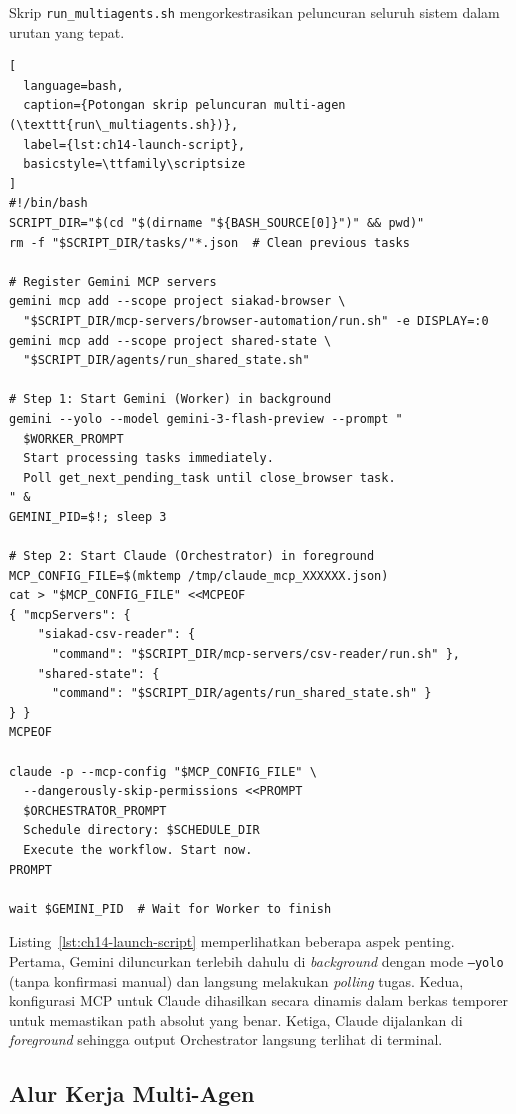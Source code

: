 Skrip \texttt{run\_multiagents.sh} mengorkestrasikan peluncuran seluruh sistem dalam urutan yang tepat.

\begin{lstlisting}[
  language=bash,
  caption={Potongan skrip peluncuran multi-agen (\texttt{run\_multiagents.sh})},
  label={lst:ch14-launch-script},
  basicstyle=\ttfamily\scriptsize
]
#!/bin/bash
SCRIPT_DIR="$(cd "$(dirname "${BASH_SOURCE[0]}")" && pwd)"
rm -f "$SCRIPT_DIR/tasks/"*.json  # Clean previous tasks

# Register Gemini MCP servers
gemini mcp add --scope project siakad-browser \
  "$SCRIPT_DIR/mcp-servers/browser-automation/run.sh" -e DISPLAY=:0
gemini mcp add --scope project shared-state \
  "$SCRIPT_DIR/agents/run_shared_state.sh"

# Step 1: Start Gemini (Worker) in background
gemini --yolo --model gemini-3-flash-preview --prompt "
  $WORKER_PROMPT
  Start processing tasks immediately.
  Poll get_next_pending_task until close_browser task.
" &
GEMINI_PID=$!; sleep 3

# Step 2: Start Claude (Orchestrator) in foreground
MCP_CONFIG_FILE=$(mktemp /tmp/claude_mcp_XXXXXX.json)
cat > "$MCP_CONFIG_FILE" <<MCPEOF
{ "mcpServers": {
    "siakad-csv-reader": {
      "command": "$SCRIPT_DIR/mcp-servers/csv-reader/run.sh" },
    "shared-state": {
      "command": "$SCRIPT_DIR/agents/run_shared_state.sh" }
} }
MCPEOF

claude -p --mcp-config "$MCP_CONFIG_FILE" \
  --dangerously-skip-permissions <<PROMPT
  $ORCHESTRATOR_PROMPT
  Schedule directory: $SCHEDULE_DIR
  Execute the workflow. Start now.
PROMPT

wait $GEMINI_PID  # Wait for Worker to finish
\end{lstlisting}

\noindent Listing~\ref{lst:ch14-launch-script} memperlihatkan beberapa aspek penting. Pertama, Gemini diluncurkan terlebih dahulu di \textit{background} dengan mode \texttt{--yolo} (tanpa konfirmasi manual) dan langsung melakukan \textit{polling} tugas. Kedua, konfigurasi MCP untuk Claude dihasilkan secara dinamis dalam berkas temporer untuk memastikan path absolut yang benar. Ketiga, Claude dijalankan di \textit{foreground} sehingga output Orchestrator langsung terlihat di terminal.

\subsection{Alur Kerja Multi-Agen}

